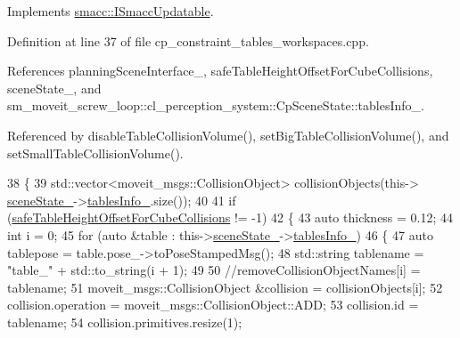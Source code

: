 Implements \hyperlink{classsmacc_1_1ISmaccUpdatable_a84ee0520cbefdb1d412bed54650b028e}{smacc\+::\+I\+Smacc\+Updatable}.



Definition at line 37 of file cp\+\_\+constraint\+\_\+tables\+\_\+workspaces.\+cpp.



References planning\+Scene\+Interface\+\_\+, safe\+Table\+Height\+Offset\+For\+Cube\+Collisions, scene\+State\+\_\+, and sm\+\_\+moveit\+\_\+screw\+\_\+loop\+::cl\+\_\+perception\+\_\+system\+::\+Cp\+Scene\+State\+::tables\+Info\+\_\+.



Referenced by disable\+Table\+Collision\+Volume(), set\+Big\+Table\+Collision\+Volume(), and set\+Small\+Table\+Collision\+Volume().


\begin{DoxyCode}
38         \{
39             std::vector<moveit\_msgs::CollisionObject> collisionObjects(this->
      \hyperlink{classsm__moveit__screw__loop_1_1cl__move__group__interface_1_1CpConstraintTableWorkspaces_ad16c51287b6178319fc8779eb88b28dd}{sceneState\_}->\hyperlink{classsm__moveit__screw__loop_1_1cl__perception__system_1_1CpSceneState_a13c7fd5645885ad697cedb48edbb3f09}{tablesInfo\_}.size());
40 
41             \textcolor{keywordflow}{if} (\hyperlink{classsm__moveit__screw__loop_1_1cl__move__group__interface_1_1CpConstraintTableWorkspaces_aef6283c1b9bc7b0aeb7c106b6e70a055}{safeTableHeightOffsetForCubeCollisions} != -1)
42             \{
43                 \textcolor{keyword}{auto} thickness = 0.12;
44                 \textcolor{keywordtype}{int} i = 0;
45                 \textcolor{keywordflow}{for} (\textcolor{keyword}{auto} &table : this->\hyperlink{classsm__moveit__screw__loop_1_1cl__move__group__interface_1_1CpConstraintTableWorkspaces_ad16c51287b6178319fc8779eb88b28dd}{sceneState\_}->\hyperlink{classsm__moveit__screw__loop_1_1cl__perception__system_1_1CpSceneState_a13c7fd5645885ad697cedb48edbb3f09}{tablesInfo\_})
46                 \{
47                     \textcolor{keyword}{auto} tablepose = table.pose\_->toPoseStampedMsg();
48                     std::string tablename = \textcolor{stringliteral}{"table\_"} + std::to\_string(i + 1);
49 
50                     \textcolor{comment}{//removeCollisionObjectNames[i] = tablename;}
51                     moveit\_msgs::CollisionObject &collision = collisionObjects[i];
52                     collision.operation = moveit\_msgs::CollisionObject::ADD;
53                     collision.id = tablename;
54                     collision.primitives.resize(1);

\end{DoxyCode}

